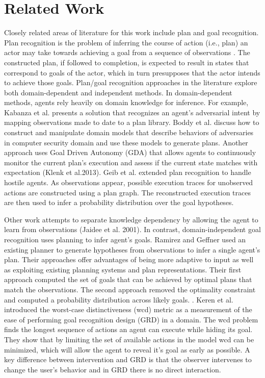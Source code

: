\documentclass[letterpaper]{article}
\theoremstyle{plain}
\begin{document}
\section{Related Work}
\label{sec:relatedwork}
Closely related areas of literature for this work include plan and goal recognition. Plan recognition is the problem of inferring the course of action (i.e., plan) an actor may take towards achieving a goal from a sequence of observations \cite{schmidt1978plan,kautz1986generalized}. The constructed plan, if followed to completion, is expected to result in states that correspond to goals of the actor, which in turn presupposes that the actor intends to achieve those goals. 
Plan/goal recognition approaches in the literature explore both domain-dependent and independent methods. In domain-dependent methods, agents rely heavily on domain knowledge for inference. For example, Kabanza et al.   presents a solution that recognizes an agent’s adversarial intent by mapping observations made to date to a plan library. Boddy et al.  discuss how to construct and manipulate domain models that describe behaviors of adversaries in computer security domain and use these models to generate plans. Another approach uses Goal Driven Autonomy (GDA) that allows agents to continuously monitor the current plan’s execution and assess if the current state matches with expectation (Klenk et al.2013)\nocite{aha2013gda}. Geib et al.  extended plan recognition to handle hostile agents. As observations appear, possible execution traces for unobserved actions are constructed using a plan graph. The reconstructed execution traces are then used to infer a probability distribution over the goal hypotheses.

Other work attempts to separate knowledge dependency by allowing the agent to learn from observations (Jaidee et al. 2001)\nocite{jaidee2011gda}. In contrast, domain-independent goal recognition uses planning to infer agent’s goals. Ramirez and Geffner  used an existing planner to generate hypotheses from observations to infer a single agent's plan. Their approaches offer advantages of being more adaptive to input as well as exploiting existing planning systems and plan representations. Their first approach computed the set of goals that can be achieved by optimal plans that match the observations. The second approach removed the optimality constraint and computed a probability distribution across likely goals. \cite{ramirez2010probabilistic}. Keren et al.  introduced the worst-case distinctiveness (wcd) metric as a measurement of the ease of performing goal recognition design (GRD) in a domain. The wcd problem finds the longest sequence of actions an agent can execute while hiding its goal. They show that by limiting the set of available actions in the model wcd can be minimized, which will allow the agent to reveal it's goal as early as possible. A key difference between intervention and GRD is that the observer intervenes to change the user's behavior and in GRD there is no direct interaction.
\end{document}
